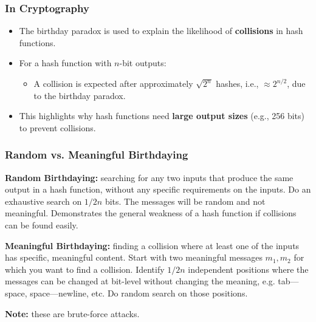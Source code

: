 \subsubsection{In Cryptography}
\begin{itemize}
    \item The birthday paradox is used to explain the likelihood of \textbf{collisions} in hash functions.
    \item For a hash function with \( n \)-bit outputs:
    \begin{itemize}
        \item A collision is expected after approximately \( \sqrt{2^n} \) hashes, i.e., \( \approx 2^{n/2} \), due to the birthday paradox.
    \end{itemize}
    \item This highlights why hash functions need \textbf{large output sizes} (e.g., 256 bits) to prevent collisions.
\end{itemize}

\subsubsection{Random vs. Meaningful Birthdaying}
\begin{defn}
    \textbf{Random Birthdaying:} searching for any two inputs that produce the same output in a hash function, without any specific requirements on the inputs. Do an exhaustive search on $1/2n$ bits. The messages will be random and not meaningful. 
    Demonstrates the general weakness of a hash function if collisions can be found easily.
\end{defn}

\begin{defn}
    \textbf{Meaningful Birthdaying:}  finding a collision where at least one of the inputs has specific, meaningful content. 
    Start with two meaningful messages $m_1, m_2$ for which you want to find a collision.
    Identify $1/2n$ independent positions where the messages can be changed at bit-level without changing the meaning, e.g. tab—space, space—newline, etc. Do random search on those positions.
\end{defn}

\textbf{Note:} these are brute-force attacks.


